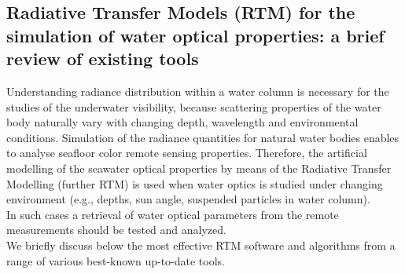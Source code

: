 \documentclass[10pt, a4paper]{article}
\begin{document}
\subsection[Radiative Transfer Models (RTM)]{Radiative Transfer Models (RTM) for the simulation of water optical properties: a brief review of existing tools}

Understanding radiance distribution within a water column is necessary for the studies of the underwater visibility, because scattering properties of the water body naturally vary with changing depth, wavelength and environmental conditions.  Simulation of the radiance quantities for natural water bodies enables to analyse seafloor color remote sensing properties. Therefore, the artificial modelling of the seawater optical properties by means of the Radiative Transfer Modelling (further RTM) is used when water optics is studied under changing environment (e.g., depths, sun angle, suspended particles in water column). \\ In such cases a retrieval of water optical parameters from the remote measurements should be tested and analyzed. \\
\pagebreak
\newpage
We briefly discuss below the most effective RTM software and algorithms from a range of various best-known up-to-date tools. 
\end{document}
